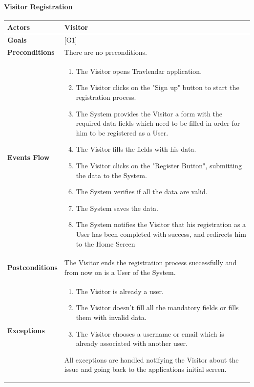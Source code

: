 \documentclass[12pt]{article}
\begin{document}
\paragraph{Visitor Registration}

\begin{center}
    \begin{tabular} { |p{}|p{}| }
        \hline
        \textbf{Actors} & Visitor \\ 
        \hline
        \textbf{Goals} & {[G1]} \\ 
        \hline  
        \textbf{Preconditions} & There are no preconditions. \\ 
        \hline
        \textbf{Events Flow} & \begin{enumerate}[topsep=0pt]
                            \setlength{\itemsep}{0.5pt}
                            \item The Visitor opens Travlendar application.
                            \item The Visitor clicks on the "Sign up" button to start the registration process.
                            \item The System provides the Visitor a form with the required data fields which need to be filled in order for him to be registered as a User.
                            \item The Visitor fills the fields with his data. 
                            \item The Visitor clicks on the "Register Button", submitting the data to the System.
                            \item The System verifies if all the data are valid.
                            \item The System saves the data.
                            \item The System notifies the Visitor that his registration as a User has been completed with success, and redirects him to the Home Screen
                            \end{enumerate} \\
        \hline
        \textbf{Postconditions} & The Visitor ends the registration process successfully and from now on is a User of the System. \\
        \hline
        \textbf{Exceptions} & \begin{enumerate}[topsep=0pt]
                            \setlength{\itemsep}{0.5pt}
                            \item The Visitor is already a user. 
                            \item The Visitor doesn't fill all the mandatory fields or fills them with invalid data.
                            \item The Visitor chooses a username or email which is already associated with another user.
                            \end{enumerate} 
                            All exceptions are handled notifying the Visitor about the issue and going back to the applications initial screen.\\ 
        \hline
    \end{tabular}
\end{center}
\end{document}
